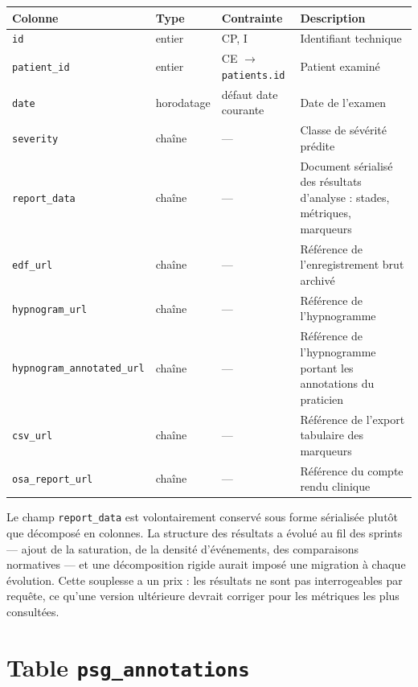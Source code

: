 \begin{table}[H]
\centering
\small
\begin{tabular}{@{}lllL{5.4cm}@{}}
\toprule
\textbf{Colonne} & \textbf{Type} & \textbf{Contrainte} & \textbf{Description} \\
\midrule
\texttt{id}          & entier     & CP, I & Identifiant technique \\
\texttt{patient\_id} & entier     & CE $\to$ \texttt{patients.id} & Patient examiné \\
\texttt{date}        & horodatage & défaut date courante & Date de l'examen \\
\texttt{severity}    & chaîne     & --- & Classe de sévérité prédite \\
\texttt{report\_data}& chaîne     & --- & Document sérialisé des résultats d'analyse :
                                          stades, métriques, marqueurs \\
\texttt{edf\_url}    & chaîne     & --- & Référence de l'enregistrement brut archivé \\
\texttt{hypnogram\_url} & chaîne  & --- & Référence de l'hypnogramme \\
\texttt{hypnogram\_annotated\_url} & chaîne & --- & Référence de l'hypnogramme portant
                                          les annotations du praticien \\
\texttt{csv\_url}    & chaîne     & --- & Référence de l'export tabulaire des
                                          marqueurs \\
\texttt{osa\_report\_url} & chaîne& --- & Référence du compte rendu clinique \\
\bottomrule
\end{tabular}
\end{table}

\noindent
Le champ \texttt{report\_data} est volontairement conservé sous forme sérialisée
plutôt que décomposé en colonnes. La structure des résultats a évolué au fil des
sprints — ajout de la saturation, de la densité d'événements, des comparaisons
normatives — et une décomposition rigide aurait imposé une migration à chaque
évolution. Cette souplesse a un prix : les résultats ne sont pas interrogeables par
requête, ce qu'une version ultérieure devrait corriger pour les métriques les plus
consultées.

\section{Table \texttt{psg\_annotations}}

